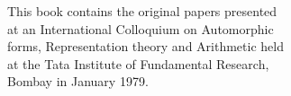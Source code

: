 \begin{center}
This book contains the original papers presented \\
at an International Colloquium on Automorphic \\
forms, Representation theory and Arithmetic held\\
at the Tata Institute of Fundamental Research, \\
Bombay in January 1979.
\end{center}

